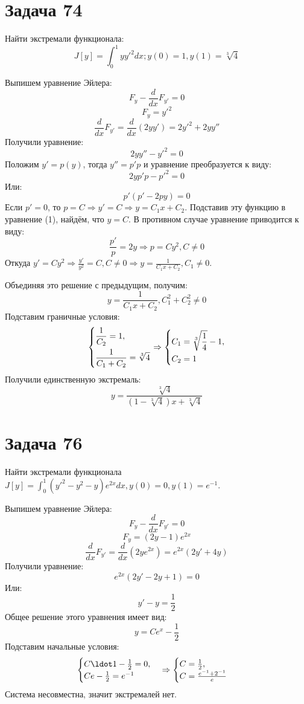 \documentclass[11pt]{article}
\begin{document}
\section{Задача 74}
\label{sec:orgce1d3c3}
Найти экстремали функционала:
$$J[y] = \int_0^1yy'^2dx; y(0) = 1, y(1) = \sqrt[3]4$$

Выпишем уравнение Эйлера:
$$F_y - \frac{d}{dx}F_{y'} = 0$$
$$F_y = y'^2$$
$$\frac{d}{dx}F_{y'} = \frac{d}{dx}(2yy') = 2y'^2 + 2yy''$$
Получили уравнение:
\begin{equation}
2yy'' - y'^2 = 0
\end{equation}
Положим \(y' = p(y)\), тогда \(y'' = p'p\) и уравнение преобразуется к виду:
$$2yp'p - p'^2 = 0$$
Или:
$$p'(p' - 2py) = 0$$
Если \(p' = 0\), то \(p = C \Rightarrow y' = C \Rightarrow y = C_1x + C_2\). Подставив эту функцию в уравнение (1), найдём,
что \(y = C\).
В противном случае уравнение приводится к виду:
$$\frac{p'}p = 2y \Rightarrow p = Cy^2, C \neq 0$$
Откуда \(y' = Cy^2 \Rightarrow \frac{y'}{y^2} = C, C \neq 0 \Rightarrow y = \frac{1}{C_1x + C_2}, C_1 \neq 0\).

Объединяя это решение с предыдущим, получим:
$$y = \frac{1}{C_1x + C_2}, C_1^2 + C_2^2 \neq 0$$
Подставим граничные условия:
\begin{equation*}
\begin{dcases}
\frac{1}{C_2} = 1, \\
\frac{1}{C_1 + C_2} = \sqrt[3]4
\end{dcases}
\Rightarrow
\begin{dcases}
C_1 = \sqrt[3]{\frac{1}4} - 1, \\
C_2 = 1
\end{dcases}
\end{equation*}
Получили единственную экстремаль:
$$y = \frac{\sqrt[3]4}{(1 - \sqrt[3]4)x + \sqrt[3]4}$$
\section{Задача 76}
\label{sec:orgebaf549}
Найти экстремали функционала \(J[y] = \int_0^1(y'^2 - y^2 - y)e^{2x}dx, y(0) = 0, y(1) = e^{-1}\).

Выпишем уравнение Эйлера:
$$F_y - \frac{d}{dx}F_{y'} = 0$$
$$F_y = (2y - 1)e^{2x}$$
$$\frac{d}{dx}F_{y'}= \frac{d}{dx}(2ye^{2x}) = e^{2x}(2y' + 4y)$$
Получили уравнение:
$$e^{2x}(2y' - 2y + 1) = 0$$
Или:
$$y' - y = \frac{1}2$$
Общее решение этого уравнения имеет вид:
$$y = Ce^x - \frac{1}2$$
Подставим начальные условия:
\begin{equation*}
\begin{cases}
C\ldot1 - \frac{1}2 = 0, \\
Ce - \frac{1}2 = e^{-1}
\end{cases}
\Rightarrow
\begin{cases}
C = \frac{1}2, \\
C = \frac{e^{-1} + 2^{-1}}e
\end{cases}
\end{equation*}
Система несовместна, значит экстремалей нет.
\end{document}
